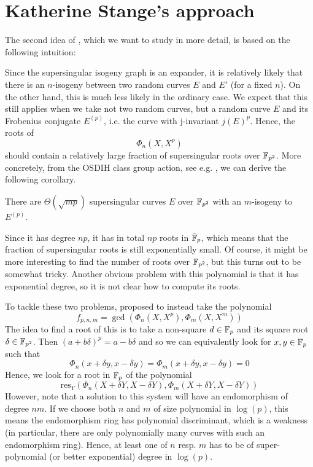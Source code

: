 \section{Katherine Stange's approach}
The second idea of \cite{base_paper}, which we want to study in more detail, is based on the following intuition:

Since the supersingular isogeny graph is an expander, it is relatively likely that there is an $n$-isogeny between two random curves $E$ and $E'$ (for a fixed $n$).
On the other hand, this is much less likely in the ordinary case.
We expect that this still applies when we take not two random curves, but a random curve $E$ and its Frobenius conjugate $E^{(p)}$, i.e. the curve with j-invariant $j(E)^p$.
Hence, the roots of
\begin{equation*}
    \Phi_n(X, X^p)
\end{equation*}
should contain a relatively large fraction of supersingular roots over $\mathbb{F}_{p^2}$.
More concretely, from the OSDIH class group action, see e.g. \cite[Thm~4.3]{chenu_smith}, we can derive the following corollary.
\begin{corollary}
    \label{prop:osidh_class_group_action}
    There are $\Theta(\sqrt{mp})$ supersingular curves $E$ over $\mathbb{F}_{p^2}$ with an $m$-isogeny to $E^{(p)}$.
\end{corollary}
Since it has degree $np$, it has in total $np$ roots in $\bar{\mathbb{F}}_p$, which means that the fraction of supersingular roots is still exponentially small.
Of course, it might be more interesting to find the number of roots over $\mathbb{F}_{p^2}$, but this turns out to be somewhat tricky.
Another obvious problem with this polynomial is that it has exponential degree, so it is not clear how to compute its roots.

To tackle these two problems, \cite{base_paper} proposed to instead take the polynomial
\begin{equation*}
    f_{p, n, m} = \gcd(\Phi_n(X, X^p), \Phi_m(X, X^m))
\end{equation*}
The idea to find a root of this is to take a non-square $d \in \mathbb{F}_p$ and its square root $\delta \in \mathbb{F}_{p^2}$.
Then $(a + b\delta)^p = a - b\delta$ and so we can equivalently look for $x, y \in \mathbb{F}_p$ such that
\begin{equation*}
    \Phi_n(x + \delta y, x - \delta y) = \Phi_m(x + \delta y, x - \delta y) = 0
\end{equation*}
Hence, we look for a root in $\mathbb{F}_p$ of the polynomial
\begin{equation*}
    \mathrm{res}_Y(\Phi_n(X + \delta Y, X - \delta Y), \Phi_m(X + \delta Y, X - \delta Y))
\end{equation*}
However, note that a solution to this system will have an endomorphism of degree $nm$.
If we choose both $n$ and $m$ of size polynomial in $\log(p)$, this means the endomorphism ring has polynomial discriminant, which is a weakness (in particular, there are only polynomially many curves with such an endomorphism ring).
Hence, at least one of $n$ resp. $m$ has to be of super-polynomial (or better exponential) degree in $\log(p)$.

